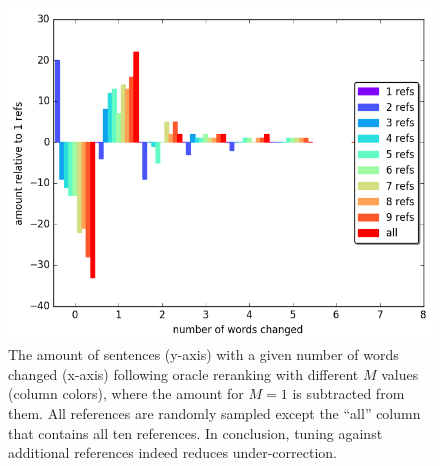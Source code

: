 \documentclass[a4paper]{article}
\begin{document}
\begin{figure}
	\includegraphics[width=0.9\columnwidth]{words_relative_differences_hist_reranking}
	\caption{The amount of sentences (y-axis) with a given number of words changed (x-axis) following oracle reranking with different $M$ values (column colors), 
	where the amount for $M=1$ is subtracted from them.
		All references are randomly sampled except the ``all'' column that contains all ten references.
		In conclusion, tuning against additional references indeed reduces under-correction.
		\label{fig:reranking_word_change}
	}
\end{figure}

%
%
\end{document}
